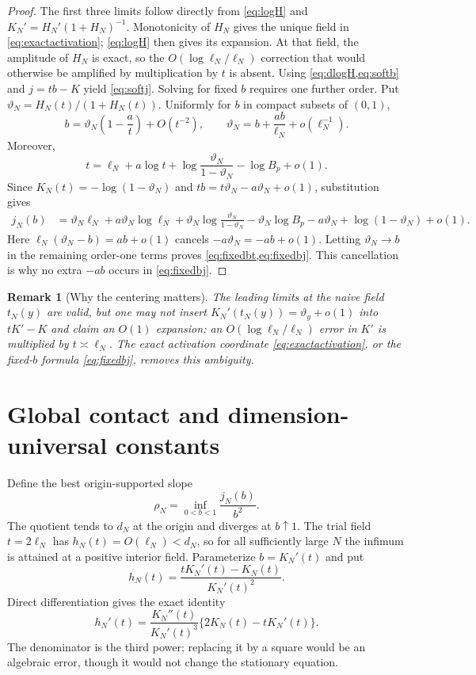 \documentclass[11pt]{article}
\newtheorem{remark}[theorem]{Remark}
\begin{document}
\begin{proof}
The first three limits follow directly from \cref{eq:logH} and
$K_N'=H_N'(1+H_N)^{-1}$.  Monotonicity of $H_N$ gives the unique field in
\cref{eq:exactactivation}; \cref{eq:logH} then gives its expansion.
At that field, the amplitude of $H_N$ is exact, so the
$O(\log\ell_N/\ell_N)$ correction that would otherwise be amplified by
multiplication by $t$ is absent.  Using \cref{eq:dlogH,eq:softb} and
$j=tb-K$ yield \cref{eq:softj}.  Solving for fixed $b$ requires one further
order.  Put $\vartheta_N=H_N(t)/(1+H_N(t))$.  Uniformly for $b$ in compact
subsets of $(0,1)$,
\[
 b=\vartheta_N\left(1-\frac at\right)+O(t^{-2}),
 \qquad
 \vartheta_N=b+\frac{ab}{\ell_N}+o(\ell_N^{-1}).
\]
Moreover,
\[
 t=\ell_N+a\log t+\log\frac{\vartheta_N}{1-\vartheta_N}
   -\log B_p+o(1).
\]
Since $K_N(t)=-\log(1-\vartheta_N)$ and
$tb=t\vartheta_N-a\vartheta_N+o(1)$, substitution gives
\begin{align*}
 j_N(b)
 &=\vartheta_N\ell_N+a\vartheta_N\log\ell_N
   +\vartheta_N\log\frac{\vartheta_N}{1-\vartheta_N}
   -\vartheta_N\log B_p-a\vartheta_N
   +\log(1-\vartheta_N)+o(1).
\end{align*}
Here $\ell_N(\vartheta_N-b)=ab+o(1)$ cancels
$-a\vartheta_N=-ab+o(1)$.  Letting $\vartheta_N\to b$ in the remaining
order-one terms proves \cref{eq:fixedbt,eq:fixedbj}.  This cancellation is
why no extra $-ab$ occurs in \cref{eq:fixedbj}.
\end{proof}

\begin{remark}[Why the centering matters]
The leading limits at the naive field $t_N(y)$ are valid, but one may not
insert $K_N'(t_N(y))=\vartheta_y+o(1)$ into $tK'-K$ and claim an $O(1)$
expansion: an $O(\log\ell_N/\ell_N)$ error in $K'$ is multiplied by
$t\asymp\ell_N$.  The exact activation coordinate
\cref{eq:exactactivation}, or the fixed-$b$ formula
\cref{eq:fixedbj}, removes this ambiguity.
\end{remark}

\section{Global contact and dimension-universal constants}

Define the best origin-supported slope
\[
 \rho_N=\inf_{0<b<1}\frac{j_N(b)}{b^2}.                  \label{eq:rho}
\]
The quotient tends to $d_N$ at the origin and diverges at $b\uparrow1$.
The trial field $t=2\ell_N$ has $h_N(t)=O(\ell_N)<d_N$, so for all
sufficiently large $N$ the infimum is attained at a positive interior field.
Parameterize $b=K_N'(t)$ and put
\[
 h_N(t)=\frac{tK_N'(t)-K_N(t)}{K_N'(t)^2}.
\]
Direct differentiation gives the exact identity
\[
 h_N'(t)=\frac{K_N''(t)}{K_N'(t)^3}
 \{2K_N(t)-tK_N'(t)\}.                                  \label{eq:hprime}
\]
The denominator is the third power; replacing it by a square would be an
algebraic error, though it would not change the stationary equation.
\end{document}
